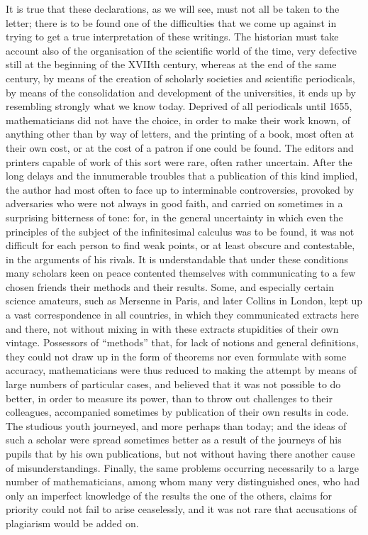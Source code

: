 It is true that these declarations, as we will see, must not all be taken to the letter; there is to be found one of the difficulties that we come up against in trying to get a true interpretation of these writings. The historian must take account also of the organisation of the scientific world of the time, very defective still at the beginning of the XVIIth century, whereas at the end of the same century, by means of the creation of scholarly societies and scientific periodicals, by means of the consolidation and development of the universities, it ends up by resembling strongly what we know today. Deprived of all periodicals until 1655, mathematicians did not have the choice, in order to make their work known, of anything other than by way of letters, and the printing of a book, most often at their own cost, or at the cost of a patron if one could be found. The editors and printers capable of work of this sort were rare, often rather uncertain. After the long delays and the innumerable troubles that a publication of this kind implied, the author had most often to face up to interminable controversies, provoked by adversaries who were not always in good faith, and carried on sometimes in a surprising bitterness of tone: for, in the general uncertainty in which even the principles of the subject of the infinitesimal calculus was to be found, it was not difficult for each person to find weak points, or at least obscure and contestable, in the arguments of his rivals. It is understandable that under these conditions many scholars keen on peace contented themselves with communicating to a few chosen friends their methods and their results. Some, and especially certain science amateurs, such as Mersenne in Paris, and later Collins in London, kept up a vast correspondence in all countries, in which they communicated extracts here and there, not without mixing in with these extracts stupidities of their own vintage. Possessors of ``methods'' that, for lack of notions and general definitions, they could not draw up in the form of theorems nor even formulate with some accuracy, mathematicians were thus reduced to making the attempt by means of large numbers of particular cases, and believed that it was not possible to do better, in order to measure its power, than to throw out challenges to their colleagues, accompanied sometimes by publication of their own results in code. The studious youth journeyed, and more perhaps than today; and the ideas of such a scholar were spread sometimes better as a result of the journeys of his pupils that by his own publications, but not without having there another cause of misunderstandings. Finally, the same problems occurring necessarily to a large number of mathematicians, among whom many very distinguished ones, who had only an imperfect knowledge of the results the one of the others, claims for priority could not fail to arise ceaselessly, and it was not rare that accusations of plagiarism would be added on.

